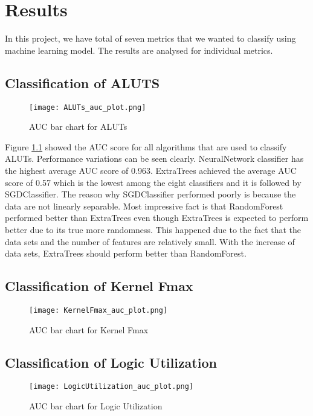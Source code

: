 \chapter{Results}

In this project, we have total of seven metrics that we wanted to classify using machine learning model. The results are analysed for individual metrics.

\section{Classification of ALUTS}
\begin{figure}[h!]
\centering
\texttt{[image: ALUTs\_auc\_plot.png]}
\caption{AUC bar chart for ALUTs}
\label{figure:ALUTs_auc_plot}
\end{figure}

Figure \ref{figure:ALUTs_auc_plot} showed the AUC score for all algorithms that are used to classify ALUTs. Performance variations can be seen clearly. NeuralNetwork classifier has the highest average AUC score of 0.963. ExtraTrees achieved the average AUC score of 0.57 which is the lowest among the eight classifiers and it is followed by SGDClassifier. The reason why SGDClassifier performed poorly is because the data are not linearly separable. Most impressive fact is that RandomForest performed better than ExtraTrees even though ExtraTrees is expected to perform better due to its true more randomness. This happened due to the fact that the data sets and the number of features are relatively small. With the increase of data sets, ExtraTrees should perform better than RandomForest.

\section{Classification of Kernel Fmax}

\begin{figure}[h!]
\centering
\texttt{[image: KernelFmax\_auc\_plot.png]}
\caption{AUC bar chart for Kernel Fmax}
\label{figure:kernelfmax_auc_plot}
\end{figure}

\section{Classification of Logic Utilization}

\begin{figure}[h!]
\centering
\texttt{[image: LogicUtilization\_auc\_plot.png]}
\caption{AUC bar chart for Logic Utilization}
\label{figure:LogicUtilization_auc_plot}
\end{figure}

